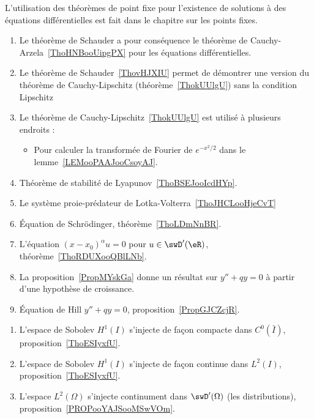 L'utilisation des théorèmes de point fixe pour l'existence de solutions à des équations différentielles est fait dans le chapitre sur les points fixes.
\begin{enumerate}
    \item
            Le théorème de Schauder a pour conséquence le théorème de Cauchy-Arzela~\ref{ThoHNBooUipgPX} pour les équations différentielles.
        \item
            Le théorème de Schauder~\ref{ThovHJXIU} permet de démontrer une version du théorème de Cauchy-Lipschitz (théorème~\ref{ThokUUlgU}) sans la condition Lipschitz
        \item
            Le théorème de Cauchy-Lipschitz~\ref{ThokUUlgU} est utilisé à plusieurs endroits :
            \begin{itemize}
                \item
                    Pour calculer la transformée de Fourier de \(  e^{-x^2/2}\) dans le lemme~\ref{LEMooPAAJooCsoyAJ}.
            \end{itemize}
    \item
        Théorème de stabilité de Lyapunov~\ref{ThoBSEJooIcdHYp}.
    \item
        Le système proie-prédateur de Lotka-Volterra~\ref{ThoJHCLooHjeCvT}
    \item
        Équation de Schrödinger, théorème~\ref{ThoLDmNnBR}.
    \item
        L'équation \( (x-x_0)^{\alpha}u=0\) pour \( u\in\swD'(\eR)\), théorème~\ref{ThoRDUXooQBlLNb}.
    \item
        La proposition~\ref{PropMYskGa} donne un résultat sur \( y''+qy=0\) à partir d'une hypothèse de croissance.
    \item
        Équation de Hill \( y''+qy=0\), proposition~\ref{PropGJCZcjR}.
\end{enumerate}


\begin{enumerate}
        \item
            L'espace de Sobolev \( H^1(I)\) s'injecte de façon compacte dans \( C^0(\bar I)\), proposition~\ref{ThoESIyxfU}.
        \item
            L'espace de Sobolev \( H^1(I)\) s'injecte de façon continue dans \( L^2(I)\), proposition~\ref{ThoESIyxfU}.
        \item
            L'espace \( L^2(\Omega)\) s'injecte continument dans \( \swD'(\Omega)\) (les distributions), proposition~\ref{PROPooYAJSooMSwVOm}.
\end{enumerate}

